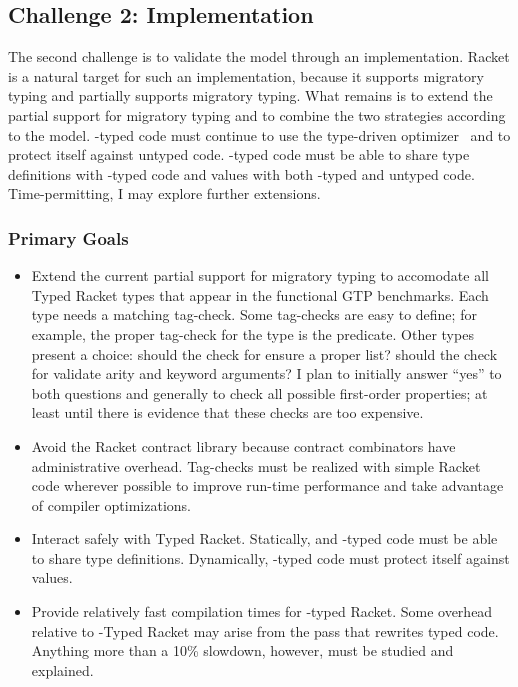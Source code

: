 \subsection{Challenge 2: Implementation}

The second challenge is to validate the model through an implementation.
Racket is a natural target for such an implementation, because it supports
 \tdeep{} migratory typing and partially supports \tshallow{} migratory typing.
What remains is to extend the partial support for \tshallow{} migratory typing
 and to combine the two strategies according to the model.
\tDeep{}-typed code must continue to use the type-driven optimizer~\cite{stff-padl-2012}
 and to protect itself against untyped code.
\tShallow{}-typed code must be able to share type definitions with
 \tdeep{}-typed code and values with both \tdeep{}-typed and untyped code.
Time-permitting, I may explore further extensions.


\subsubsection{Primary Goals}

\begin{itemize}
  \item
    Extend the current partial support for \tshallow{} migratory typing
     to accomodate all Typed Racket types that appear in the functional GTP
     benchmarks.
    Each type needs a matching tag-check.
    Some tag-checks are easy to define; for example, the proper tag-check for
     the  type is the  predicate.
    Other types present a choice:
     should the check for  ensure a proper list?
     should the check for \racketcode{->*} validate arity and keyword arguments?
    I plan to initially answer ``yes'' to both questions and generally to check
     all possible first-order properties; at least until there is evidence
     that these checks are too expensive.
  \item
    Avoid the Racket contract library
    because contract combinators have administrative overhead.
    Tag-checks must be realized with simple Racket code wherever possible to
     improve run-time performance and take advantage of compiler optimizations.
  \item
    Interact safely with Typed Racket.
    Statically, \tshallow{} and \tdeep{}-typed code must be able to share type definitions.
    Dynamically, \tdeep{}-typed code must protect itself against \tshallow{} values.
  \item
    Provide relatively fast compilation times for \tshallow{}-typed Racket.
    Some overhead relative to \tdeep{}-Typed Racket may arise from the pass that
    rewrites typed code.
    Anything more than a 10\% slowdown, however, must be studied and explained.
\end{itemize}


